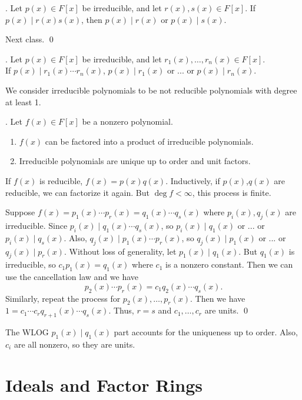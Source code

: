 \thm. Let \(p(x) \in F[x]\) be irreducible, and let \(r(x), s(x) \in F[x]\). If \(p(x) \mid r(x)s(x)\), then \(p(x) \mid r(x)\) or \(p(x) \mid s(x)\).

\pf Next class. \qed

\cor. Let \(p(x) \in F[x]\) be irreducible, and let \(r_1(x), \dots, r_n(x) \in F[x]\). \\
If \(p(x) \mid r_1(x) \cdots r_n(x)\), \(p(x) \mid r_1(x)\) or ... or \(p(x) \mid r_n(x)\).

We consider irreducible polynomials to be not reducible polynomials with degree at least 1.

\thm. Let \(f(x) \in F[x]\) be a nonzero polynomial.
\begin{enumerate}
    \item \(f(x)\) can be factored into a product of irreducible polynomials.
    \item Irreducible polynomials are unique up to order and unit factors.
\end{enumerate}

\pf {} If \(f(x)\) is reducible, \(f(x) = p(x)q(x)\). Inductively, if \(p(x)\),\(q(x)\) are reducible, we can factorize it again. But \(\deg f < \infty\), this process is finite.

 Suppose \(f(x) = p_1(x)\cdots p_r(x) = q_1(x)\cdots q_s(x)\) where \(p_i(x), q_j(x)\) are irreducible. Since \(p_i(x) \mid q_1(x)\cdots q_s(x)\), so \(p_i(x) \mid q_1(x)\) or ... or \(p_i(x) \mid q_s(x)\). Also, \(q_j(x) \mid p_1(x)\cdots p_r(x)\), so \(q_j(x) \mid p_1(x)\) or ... or \(q_j(x) \mid p_r(x)\). Without loss of generality, let \(p_1(x) \mid q_1(x)\). But \(q_1(x)\) is irreducible, so \(c_1 p_1(x) = q_1(x)\) where \(c_1\) is a nonzero constant. Then we can use the cancellation law and we have
\[
    p_2(x) \cdots p_r(x) = c_1 q_2(x)\cdots q_s(x).
\]
Similarly, repeat the process for \(p_2(x), \dots, p_r(x)\). Then we have \(1 = c_1\cdots c_r q_{r+1}(x)\cdots q_s(x)\). Thus, \(r = s\) and \(c_1, \dots, c_r\) are units. \qed

\rmk The WLOG \(p_1(x) \mid q_1(x)\) part accounts for the uniqueness up to order. Also, \(c_i\) are all nonzero, so they are units.

\chapter{Ideals and Factor Rings}

\setcounter{topic}{25}


